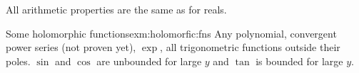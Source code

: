 \documentclass[../main.tex]{subfiles}
\begin{document}
    All arithmetic properties are the same as for reals.

    \begin{example}{Some holomorphic functions}{exm:holomorfic:fns}
        Any polynomial, convergent power series (not proven yet), $\exp$,
        all trigonometric functions outside their poles. $\sin$ and $\cos$
        are unbounded for large $y$ and $\tan$ is bounded for large $y$.  
    \end{example}
    
\end{document}
